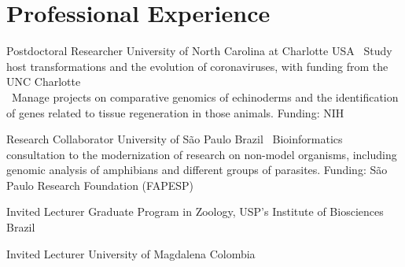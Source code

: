 
\section{Professional Experience}

    	{Postdoctoral Researcher}
    	{University of North Carolina at Charlotte}
    	{USA}
    	{}
    	{
    		\textbullet~Study host transformations and the evolution of coronaviruses, with funding from the UNC Charlotte\\
    		\textbullet~Manage projects on comparative genomics of echinoderms and the identification of genes related to tissue regeneration in those animals. Funding: NIH\\
    	}
    
    	{Research Collaborator}
    	{University of São Paulo}
    	{Brazil}
    	{}
    	{
    		\textbullet~Bioinformatics consultation to the modernization of research on non-model organisms, including genomic analysis of amphibians and different groups of parasites. Funding: São Paulo Research Foundation (FAPESP)\\
    	}
    
    	{Invited Lecturer}
    	{Graduate Program in Zoology, USP's Institute of Biosciences}
    	{Brazil}
    	{}
    	{}
    
    	{Invited Lecturer}
    	{University of Magdalena}
    	{Colombia}
    	{}
    	{}